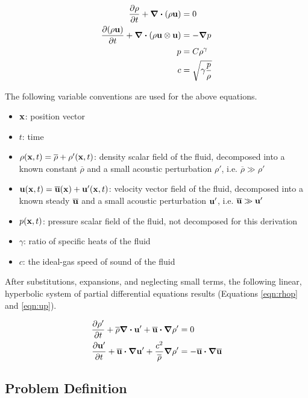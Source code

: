 \documentclass{article}
\begin{document}
\begin{align}
	\pdv{\rho}{t} + \div{(\rho \vb{u})} &= 0 \label{eqn:com} \\
	\pdv{(\rho \vb{u})}{t} + \div{(\rho \vb{u} \otimes \vb{u})} &= - \grad{p} \label{eqn:cop} \\
	p &= C \rho^{\gamma} \label{eqn:isen} \\
	c &= \sqrt{\gamma \frac{p}{\rho}} \label{eqn:sos}
\end{align}

The following variable conventions are used for the above equations.

\begin{itemize}
	\item $\vb{x}$: position vector
	\item $t$: time
	\item $\rho(\vb{x}, t) = \overline{\rho} + \rho'(\vb{x}, t)$: density scalar field of the fluid, decomposed into a known constant $\overline{\rho}$ and a small acoustic perturbation $\rho'$, i.e. $\overline{\rho} \gg \rho'$
	\item $\vb{u}(\vb{x}, t) = \overline{\vb{u}}(\vb{x}) + \vb{u}'(\vb{x}, t)$: velocity vector field of the fluid, decomposed into a known steady $\overline{\vb{u}}$ and a small acoustic perturbation $\vb{u}'$, i.e. $\overline{\vb{u}} \gg \vb{u}'$
	\item $p(\vb{x}, t)$: pressure scalar field of the fluid, not decomposed for this derivation
	\item $\gamma$: ratio of specific heats of the fluid
	\item $c$: the ideal-gas speed of sound of the fluid
\end{itemize}

After substitutions, expansions, and neglecting small terms, the following linear, hyperbolic system of partial differential equations results (Equations \ref{eqn:rhop} and \ref{eqn:up}).

\begin{align}
	\pdv{\rho'}{t} + \overline{\rho} \div{\vb{u}'} + \overline{\vb{u}} \vdot \grad{\rho'} &= 0 \label{eqn:rhop} \\
	\pdv{\vb{u}'}{t} + \overline{\vb{u}} \vdot \grad{\vb{u}'} + \frac{c^{2}}{\overline{\rho}} \grad{\rho'} &= - \overline{\vb{u}} \vdot \grad{\overline{\vb{u}}} \label{eqn:up}
\end{align}

\subsection{Problem Definition}
\end{document}
